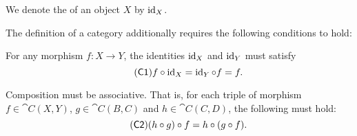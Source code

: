 \begin{definition}
\begin{thmenum}[series=def:category]
     We denote the  of an object \( X \) by \( \operatorname{id}_X \).
  \end{thmenum}

  The definition of a category additionally requires the following conditions to hold:
  \begin{thmenum}[resume=def:category]
     For any morphism \( f: X \to Y \), the identities \( \operatorname{id}_X \) and \( \operatorname{id}_Y \) must satisfy
    \begin{equation}\label{eq:def:category/C1}\tag{\logic{C1}}
      f \bincirc \id_X = \id_Y \bincirc f = f.
    \end{equation}

     Composition must be associative. That is, for each triple of morphism \( f \in \cat{C}(X, Y) \), \( g \in \cat{C}(B, C) \) and \( h \in \cat{C}(C, D) \), the following must hold:
    \begin{equation}\label{eq:def:category/C2}\tag{\logic{C2}}
      (h \bincirc g) \bincirc f = h \bincirc (g \bincirc f).
    \end{equation}
  \end{thmenum}
\end{definition}

